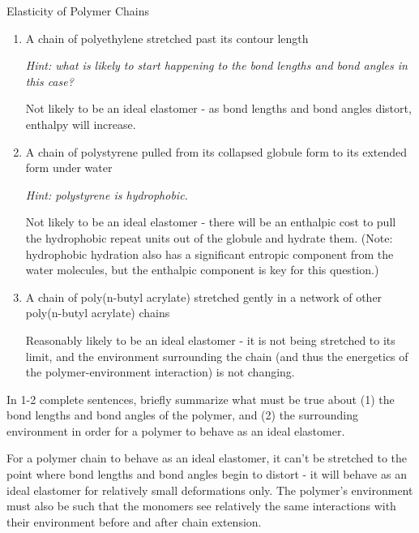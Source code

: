 \begin{activity}{Elasticity of Polymer Chains}
\begin{ctqs}
		\begin{enumerate}
			\item A chain of polyethylene stretched past its contour length
			
				\emph{Hint: what is likely to start happening to the bond lengths and bond angles in this case?}
		
				\begin{solution}[1in]{}
					Not likely to be an ideal elastomer - as bond lengths and bond angles distort, enthalpy will increase.
				\end{solution}
				
			\item A chain of polystyrene pulled from its collapsed globule form to its extended form under water
			
				\emph{Hint: polystyrene is hydrophobic.}
		
				\begin{solution}[1in]{}
					Not likely to be an ideal elastomer - there will be an enthalpic cost to pull the hydrophobic repeat units out of the globule and hydrate them.  (Note: hydrophobic hydration also has a significant entropic component from the water molecules, but the enthalpic component is key for this question.)
				\end{solution}
			
			\item A chain of poly(n-butyl acrylate) stretched gently in a network of other poly(n-butyl acrylate) chains
		
				\begin{solution}[1in]{}
					Reasonably likely to be an ideal elastomer - it is not being stretched to its limit, and the environment surrounding the chain (and thus the energetics of the polymer-environment interaction) is not changing.
				\end{solution}
		\end{enumerate}	
	
	\question In 1-2 complete sentences, briefly summarize what must be true about (1) the bond lengths and bond angles of the polymer, and (2) the surrounding environment in order for a polymer to behave as an ideal elastomer.
		
		\begin{solution}[1.75in]{}
			For a polymer chain to behave as an ideal elastomer, it can't be stretched to the point where bond lengths and bond angles begin to distort - it will behave as an ideal elastomer for relatively small deformations only.  The polymer's environment must also be such that the monomers see relatively the same interactions with their environment before and after chain extension.
		\end{solution}


\end{ctqs}
\end{activity}

